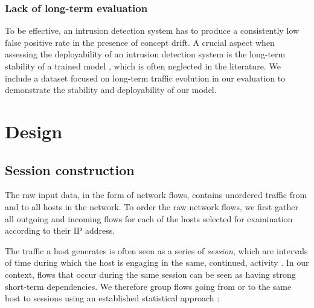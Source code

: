 \subsubsection{Lack of long-term evaluation}

To be effective, an intrusion detection system has to produce a consistently low false positive rate in the presence of concept drift. %
A crucial aspect when assessing the deployability of an intrusion detection system is the long-term stability of a trained model \cite{koutrouki2018mitigating}, which is often neglected in the literature.
We include a dataset focused on long-term traffic evolution in our evaluation to demonstrate the stability and deployability of our model. 




\section{Design}\label{Sec:Design}

\subsection{Session construction}

The raw input data, in the form of network flows, contains unordered traffic from and to all hosts in the network. %
To order the raw network flows, we  first gather all outgoing and incoming flows for each of the hosts selected for examination according to their IP address. 

The traffic a host generates is often seen as a series of \emph{session}, which are intervals of time  during which the host is engaging in the same, continued, activity \cite{rubin2014three}. In our context, flows that occur during the same session can be seen as having strong short-term dependencies. We therefore group flows going from or to the same host to sessions using an established statistical approach \cite{rubin2014three}:

